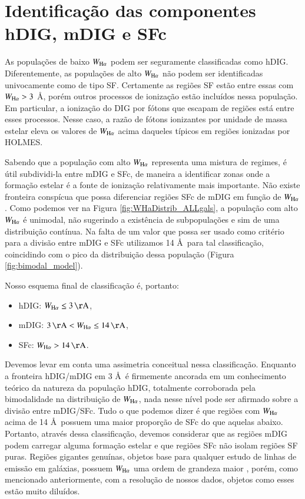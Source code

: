 \section{Identificação das componentes hDIG, mDIG e SFc}
\label{sec:DIGclass:identclass}

As populações de baixo $W_{\Ha}$ podem ser seguramente classificadas como hDIG. Diferentemente, as populações de alto $W_{\Ha}$ não podem ser identificadas univocamente como de tipo SF. Certamente as regiões SF estão entre essas com $W_{\Ha} > 3$ \AA, porém outros processos de ionização estão incluídos nessa população. Em particular, a ionização do DIG por fótons que escapam de regiões \hii está entre esses processos. Nesse caso, a razão de fótons ionizantes por unidade de massa estelar eleva os valores de $W_{\Ha}$ acima daqueles típicos em regiões ionizadas por HOLMES.

Sabendo que a população com alto $W_{\Ha}$ representa uma mistura de regimes, é útil subdividi-la entre mDIG e SFc, de maneira a identificar zonas onde a formação estelar é a fonte de ionização relativamente mais importante. Não existe fronteira conspícua que possa diferenciar regiões SFc de mDIG em função de $W_{\Ha}$. Como podemos ver na Figura \ref{fig:WHaDistrib_ALLgals}, a população com alto $W_{\Ha}$ é unimodal, não sugerindo a existência de subpopulações e sim de uma distribuição contínua. Na falta de um valor que possa ser usado como critério para a divisão entre mDIG e SFc utilizamos 14 \AA\ para tal classificação, coincidindo com o pico da distribuição dessa população
(Figura \ref{fig:bimodal_model}).

Nosso esquema final de classificação é, portanto:

\begin{itemize}
 \item hDIG: $W_{\Ha} \le 3 \,\mathrm{\AA}$,
 \item mDIG:  $3 \,\mathrm{\AA}  < W_{\Ha} \le 14 \,\mathrm{\AA}$,
 \item SFc: $W_{\Ha} > 14 \,\mathrm{\AA}$.
\end{itemize}

Devemos levar em conta uma assimetria conceitual nessa classificação. Enquanto a fronteira hDIG/mDIG em 3 \AA\ é firmemente ancorada em um conhecimento teórico da natureza da população hDIG, totalmente corroborada pela bimodalidade na distribuição de $W_{\Ha}$, nada nesse nível pode ser afirmado sobre a divisão entre mDIG/SFc. Tudo o que podemos dizer é que regiões com $W_{\Ha}$ acima de 14 \AA\ possuem uma maior proporção de SFc do que aquelas abaixo. Portanto, através dessa classificação, devemos considerar que as regiões mDIG podem carregar alguma formação estelar e que regiões SFc não isolam regiões SF puras. Regiões \hii gigantes genuínas, objetos base para qualquer estudo de linhas de emissão em galáxias, possuem $W_{\Ha}$ uma ordem de grandeza maior \citep{McCall.etal.1985, Garnett.and.Shields.1987, Kennicutt.and.Garnett.1996, Luridiana.and.Peimbert.2001, Bresolin.etal.2004}, porém, como mencionado anteriormente, com a resolução de nossos dados, objetos como esses estão muito diluídos.

